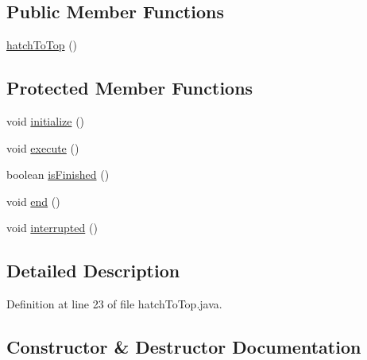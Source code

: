 \subsection*{Public Member Functions}
\begin{DoxyCompactItemize}
\item 
\mbox{\hyperlink{classorg_1_1usfirst_1_1frc3707_1_1_creedence_1_1commands_1_1hatch_to_top_acd9b725faa5948e731292f51c5b46145}{hatch\+To\+Top}} ()
\end{DoxyCompactItemize}
\subsection*{Protected Member Functions}
\begin{DoxyCompactItemize}
\item 
void \mbox{\hyperlink{classorg_1_1usfirst_1_1frc3707_1_1_creedence_1_1commands_1_1hatch_to_top_a7b0813d281fd6caa8000021963107139}{initialize}} ()
\item 
void \mbox{\hyperlink{classorg_1_1usfirst_1_1frc3707_1_1_creedence_1_1commands_1_1hatch_to_top_a1e5e5591b810e5fa89bd01033b05a4cf}{execute}} ()
\item 
boolean \mbox{\hyperlink{classorg_1_1usfirst_1_1frc3707_1_1_creedence_1_1commands_1_1hatch_to_top_a79cdfd679df60caebe7c63bbc1ff7413}{is\+Finished}} ()
\item 
void \mbox{\hyperlink{classorg_1_1usfirst_1_1frc3707_1_1_creedence_1_1commands_1_1hatch_to_top_a3c3aa7fc554830b5a0a08c9103f8108a}{end}} ()
\item 
void \mbox{\hyperlink{classorg_1_1usfirst_1_1frc3707_1_1_creedence_1_1commands_1_1hatch_to_top_a52b8bc3027a1887851d80bc5ca05f5c2}{interrupted}} ()
\end{DoxyCompactItemize}


\subsection{Detailed Description}


Definition at line 23 of file hatch\+To\+Top.\+java.



\subsection{Constructor \& Destructor Documentation}
\mbox{\label{classorg_1_1usfirst_1_1frc3707_1_1_creedence_1_1commands_1_1hatch_to_top_acd9b725faa5948e731292f51c5b46145}} 
